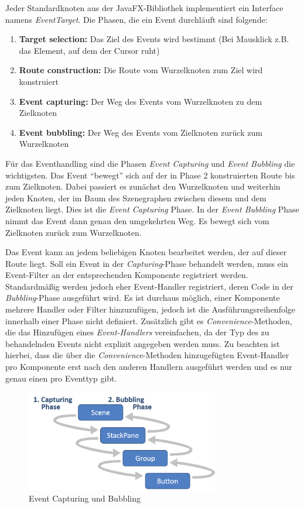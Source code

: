 Jeder Standardknoten aus der JavaFX-Bibliothek implementiert ein Interface namens \textit{EventTarget}. Die Phasen, die ein Event durchläuft sind folgende:
\begin{enumerate}
	\item \textbf{Target selection:} Das Ziel des Events wird bestimmt (Bei Mausklick z.B. das Element, auf dem der Cursor ruht)
	\item \textbf{Route construction:} Die Route vom Wurzelknoten zum Ziel wird konstruiert
	\item \textbf{Event capturing:} Der Weg des Events vom Wurzelknoten zu dem Zielknoten
	\item \textbf{Event bubbling:} Der Weg des Events vom Zielknoten zurück zum Wurzelknoten
\end{enumerate}
Für das Eventhandling sind die Phasen \textit{Event Capturing} und \textit{Event Bubbling} die wichtigsten. Das Event \enquote{bewegt} sich auf der in Phase 2 konstruierten Route bis zum Zielknoten. Dabei passiert es zunächst den Wurzelknoten und weiterhin jeden Knoten, der im Baum des Szenegraphen zwischen diesem und dem Zielknoten liegt. Dies ist die \textit{Event Capturing} Phase. In der \textit{Event Bubbling} Phase nimmt das Event dann genau den umgekehrten Weg. Es bewegt sich vom Zielknoten zurück zum Wurzelknoten.\par
Das Event kann an jedem beliebigen Knoten bearbeitet werden, der auf dieser Route liegt. Soll ein Event in der \textit{Capturing}-Phase behandelt werden, muss ein Event-Filter an der entsprechenden Komponente registriert werden. Standardmäßig werden jedoch eher Event-Handler registriert, deren Code in der \textit{Bubbling}-Phase ausgeführt wird. Es ist durchaus möglich, einer Komponente mehrere Handler oder Filter hinzuzufügen, jedoch ist die Ausführungsreihenfolge innerhalb einer Phase nicht definiert. Zusätzlich gibt es \textit{Convenience}-Methoden, die das Hinzufügen eines \textit{Event-Handlers} vereinfachen, da der Typ des zu behandelnden Events nicht explizit angegeben werden muss. Zu beachten ist hierbei, dass die über die \textit{Convenience}-Methoden hinzugefügten Event-Handler pro Komponente erst nach den anderen Handlern ausgeführt werden und es nur genau einen pro Eventtyp gibt.\par
\begin{figure}[H]
 \centering
 \includegraphics[width=0.75\textwidth]{grafiken/event_phase.png}
 \caption{Event Capturing und Bubbling}
 \label{fig:eventPhase}
\end{figure} 
